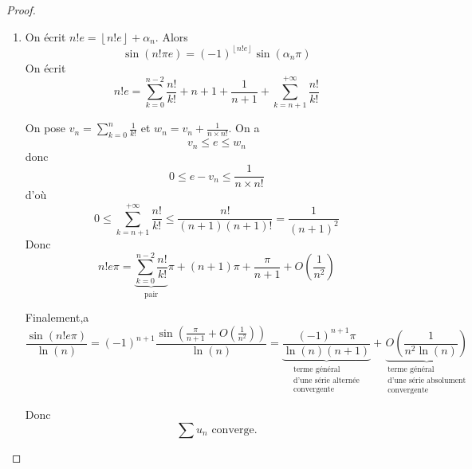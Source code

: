 \documentclass[12pt]{article}
\begin{document}
\begin{proof}
\begin{enumerate}
		\item On écrit $n!e=\left\lfloor n!e\right\rfloor+\alpha_{n}$.
		Alors 
		\begin{equation}\sin(n!\pi e)=(-1)^{\left\lfloor n!e\right\rfloor}\sin(\alpha_{n}\pi)\end{equation}
		On écrit 
		\begin{equation}n!e=\sum_{k=0}^{n-2}\frac{n!}{k!}+n+1+\frac{1}{n+1}+\sum_{k=n+1}^{+\infty}\frac{n!}{k!}\end{equation}

		On pose $v_{n}=\sum_{k=0}^{n}\frac{1}{k!}$ et $w_{n}=v_{n}+\frac{1}{n\times n!}$. On a 
		\begin{equation}v_{n}\leqslant e\leqslant w_{n}\end{equation}
		donc 
		\begin{equation}0\leqslant e-v_{n}\leqslant\frac{1}{n\times n!}\end{equation}
		d'où
		\begin{equation}0\leqslant \sum_{k=n+1}^{+\infty}\frac{n!}{k!}\leqslant\frac{n!}{(n+1)(n+1)!}=\frac{1}{(n+1)^{2}}\end{equation}
		Donc 
		\begin{equation}n!e\pi = \underbrace{\sum_{k=0}^{n-2}\frac{n!}{k!}}_{\text{pair}}\pi+(n+1)\pi+\frac{\pi}{n+1}+O\left(\frac{1}{n^{2}}\right)\end{equation}

		Finalement,a
		\begin{equation}\frac{\sin(n!e\pi)}{\ln(n)}=(-1)^{n+1}\frac{\sin\left(\frac{\pi}{n+1}+O\left(\frac{1}{n^{2}}\right)\right)}{\ln(n)}=\underbrace{\frac{(-1)^{n+1}\pi}{\ln(n)(n+1)}}_{\substack{\text{terme général}\\\text{d'une série alternée}\\\text{convergente}}}+\underbrace{O\left(\frac{1}{n^{2}\ln(n)}\right)}_{\substack{\text{terme général}\\\text{d'une série absolument}\\\text{convergente}}}\end{equation}

		Donc 
		\begin{equation}\boxed{\sum u_{n}\text{ converge.}}\end{equation}
	\end{enumerate}
\end{proof}
\end{document}
